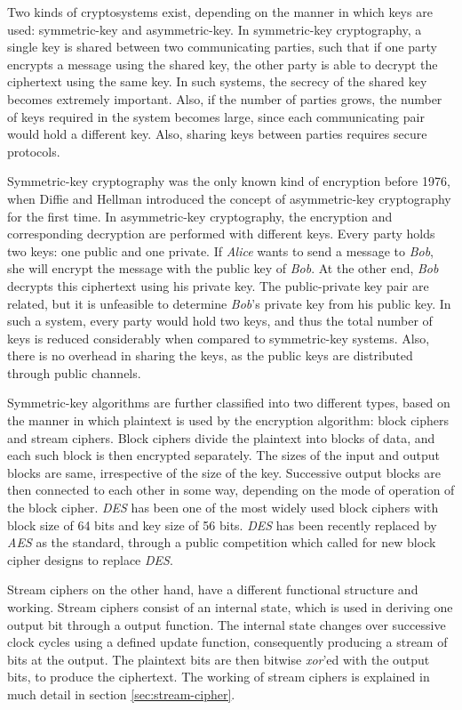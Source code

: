 
Two kinds of cryptosystems exist, depending on the manner in which keys are used: symmetric-key and asymmetric-key. In symmetric-key cryptography, a single key is shared between two communicating parties, such that if one party encrypts a message using the shared key, the other party is able to decrypt the ciphertext using the same key. In such systems, the secrecy of the shared key becomes extremely important. Also, if the number of parties grows, the number of keys required in the system becomes large, since each communicating pair would hold a different key. Also, sharing keys between parties requires secure protocols. 

Symmetric-key cryptography was the only known kind of encryption before 1976, when Diffie and Hellman introduced the concept of asymmetric-key cryptography \cite{diffie1976ndc} for the first time. In asymmetric-key cryptography, the encryption and corresponding decryption are performed with different keys. Every party holds two keys: one public and one private. If \emph{Alice} wants to send a message to \emph{Bob}, she will encrypt the message with the public key of \emph{Bob}. At the other end, \emph{Bob} decrypts this ciphertext using his private key. The public-private key pair are related, but it is unfeasible to determine \emph{Bob}'s private key from his public key. In such a system, every party would hold two keys, and thus the total number of keys is reduced considerably when compared to symmetric-key systems. Also, there is no overhead in sharing the keys, as the public keys are distributed through public channels.

Symmetric-key algorithms are further classified into two different types, based on the manner in which plaintext is used by the encryption algorithm: block ciphers and stream ciphers. Block ciphers divide the plaintext into blocks of data, and each such block is then encrypted separately. The sizes of the input and output blocks are same, irrespective of the size of the key. Successive output blocks are then connected to each other in some way, depending on the mode of operation of the block cipher. \emph{DES} has been one of the most widely used block ciphers with block size of 64 bits and key size of 56 bits. \emph{DES} has been recently replaced by \emph{AES} as the standard, through a public competition which called for new block cipher designs to replace \emph{DES}.

Stream ciphers on the other hand, have a different functional structure and working. Stream ciphers consist of an internal state, which is used in deriving one output bit through a output function. The internal state changes over successive clock cycles using a defined update function, consequently producing a stream of bits at the output. The plaintext bits are then bitwise \emph{xor}'ed with the output bits, to produce the ciphertext. The working of stream ciphers is explained in much detail in section \ref{sec:stream-cipher}. 

